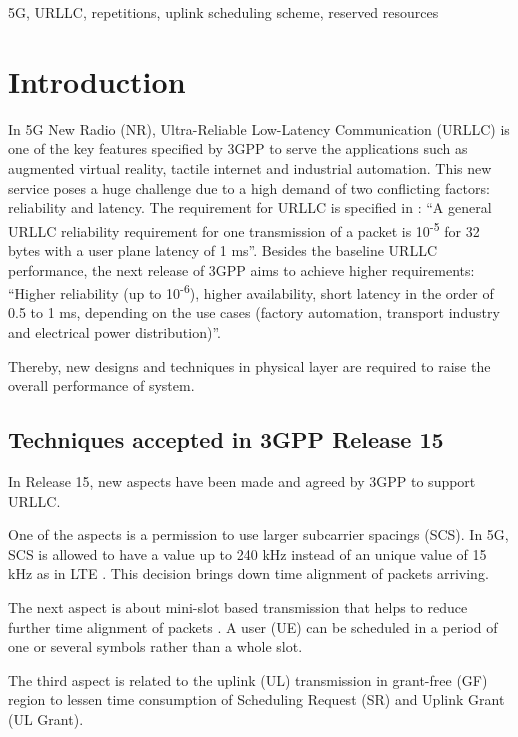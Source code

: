 \documentclass[conference]{IEEEtran}
\begin{document}
\begin{IEEEkeywords}
5G, URLLC, repetitions, uplink scheduling scheme, reserved resources
\end{IEEEkeywords}

\section{Introduction} \label{I}
In 5G New Radio (NR), Ultra-Reliable Low-Latency Communication (URLLC) is one of the key features specified by 3GPP to serve the applications such as augmented virtual reality, tactile internet and industrial automation. This new service poses a huge challenge due to a high demand of two conflicting factors: reliability and latency. The requirement for URLLC is specified in \cite{b6}: ``A general URLLC reliability requirement for one transmission of a packet is 10\textsuperscript{-5} for 32 bytes with a user plane latency of 1 ms''. Besides the baseline URLLC performance, the next release of 3GPP aims to achieve higher requirements: ``Higher reliability (up to 10\textsuperscript{-6}), higher availability, short latency in the order of 0.5 to 1 ms, depending on the use cases (factory automation, transport industry and electrical power distribution)''\cite{b8}.

Thereby, new designs and techniques in physical layer are required to raise the overall performance of system.

\subsection{Techniques accepted in 3GPP Release 15}\label{IAA}
In Release 15, new aspects have been made and agreed by 3GPP to support URLLC. 

One of the aspects is a permission to use larger subcarrier spacings (SCS). In 5G, SCS is allowed to have a value up to 240 kHz instead of an unique value of 15 kHz as in LTE \cite{ad2}. This decision brings down time alignment of packets arriving. 

The next aspect is about mini-slot based transmission that helps to reduce further time alignment of packets \cite{ad3}. A user (UE) can be scheduled in a period of one or several symbols rather than a whole slot. 

The third aspect is related to the uplink (UL) transmission in grant-free (GF) region to lessen time consumption of Scheduling Request (SR) and Uplink Grant (UL Grant)\cite{ad4}.
\end{document}
